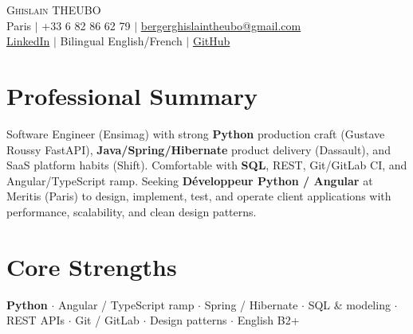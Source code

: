 \documentclass[letterpaper,10.5pt]{article}
\begin{document}
\begin{center}
{\Huge \scshape Ghislain THEUBO} \\ \vspace{2pt}
\small Paris $|$ +33 6 82 86 62 79 $|$ \href{mailto:bergerghislaintheubo@gmail.com}{bergerghislaintheubo@gmail.com} \\
\href{https://www.linkedin.com/in/berger-ghislain}{LinkedIn} $|$ Bilingual English/French $|$ \href{https://github.com/Bergerghislain}{GitHub}
\end{center}
\vspace{-6pt}
\section{Professional Summary}
\small{Software Engineer (Ensimag) with strong \textbf{Python} production craft (Gustave Roussy FastAPI), \textbf{Java/Spring/Hibernate} product delivery (Dassault), and SaaS platform habits (Shift). Comfortable with \textbf{SQL}, REST, Git/GitLab CI, and Angular/TypeScript ramp. Seeking \textbf{D\'eveloppeur Python / Angular} at Meritis (Paris) to design, implement, test, and operate client applications with performance, scalability, and clean design patterns.}
\section{Core Strengths}
\small{\textbf{Python} $\cdot$ Angular / TypeScript ramp $\cdot$ Spring / Hibernate $\cdot$ SQL \& modeling $\cdot$ REST APIs $\cdot$ Git / GitLab $\cdot$ Design patterns $\cdot$ English B2+}
\end{document}
